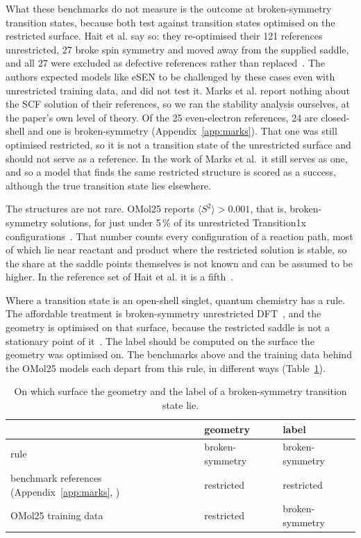 What these benchmarks do not measure is the outcome at broken-symmetry
transition states, because both test against transition states
optimised on the restricted surface. Hait et al. say so: they
re-optimised their 121 references unrestricted, 27 broke spin symmetry
and moved away from the supplied saddle, and all 27 were excluded as
defective references rather than replaced~\cite{hait2025}. The authors
expected models like eSEN to be challenged by these cases even with
unrestricted training data, and did not test it. Marks et al. report
nothing about the SCF solution of their references, so we ran the
stability analysis ourselves, at the paper's own level of theory. Of
the 25 even-electron references, 24 are closed-shell and one is
broken-symmetry (Appendix~\ref{app:marks}). That one was still optimised restricted, so it is not a transition
state of the unrestricted surface and should not serve as a
reference. In the work of Marks et al.\ it still serves as one, and so
a model that finds the same restricted structure is scored as a
success, although the true transition state lies elsewhere.

The structures are not rare. OMol25 reports $\langle S^2 \rangle >
0.001$, that is, broken-symmetry solutions, for just under 5\,\% of
its unrestricted Transition1x configurations~\cite{omol25}. That number counts every configuration of
a reaction path, most of which lie near reactant and product where the
restricted solution is stable, so the share at the saddle points
themselves is not known and can be assumed to be higher. In the
reference set of Hait et al. it is a fifth~\cite{hait2025}.

Where a transition state is an open-shell singlet, quantum chemistry
has a rule. The affordable treatment is broken-symmetry unrestricted
DFT~\cite{grafenstein2002}, and the geometry is optimised on that
surface, because the restricted saddle is not a stationary point of
it~\cite{crawford2001}. The label should be computed on the surface the
geometry was optimised on. The
benchmarks above and the training data behind the OMol25 models each
depart from this rule, in different ways (Table~\ref{tab:surfaces}).

\begin{table}[h]
\centering
\small
\caption{On which surface the geometry and the label of a
broken-symmetry transition state lie.}
\label{tab:surfaces}
\begin{tabular}{@{}lll@{}}
\toprule
 & geometry & label \\
\midrule
rule & broken-symmetry & broken-symmetry \\
benchmark references (Appendix~\ref{app:marks}, \cite{hait2025, marks2026}) & restricted & restricted \\
OMol25 training data~\cite{omol25} & restricted & broken-symmetry \\
\bottomrule
\end{tabular}
\end{table}

